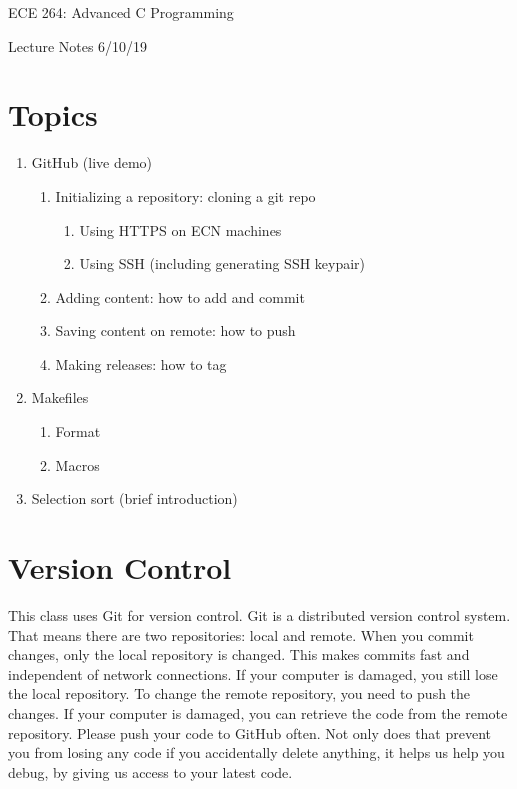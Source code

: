 \documentclass{article}
\begin{document}
\begin{center}{\LARGE ECE 264: Advanced C Programming} \end{center}
\begin{center}{\large Lecture Notes 6/10/19} \end{center}

\bigskip

\section{Topics}
\begin{enumerate}
\item GitHub (live demo)
	\begin{enumerate}
	\item Initializing a repository: cloning a git repo
	  \begin{enumerate}
	    \item Using HTTPS on ECN machines
	    \item Using SSH (including generating SSH keypair)
	  \end{enumerate}
	\item Adding content: how to add and commit
	\item Saving content on remote: how to push
	\item Making releases: how to tag
	\end{enumerate}
\item Makefiles
  \begin{enumerate}
  \item Format
  \item Macros
  \end{enumerate}
\item Selection sort (brief introduction)
\end{enumerate}


\section{Version Control}
This class uses Git for version control. Git is a distributed version control system. That means there are two repositories: local and remote. When you commit changes, only the local repository is changed. This makes commits fast and independent of network connections. If your computer is damaged, you still lose the local repository. To change the remote repository, you need to push the changes. If your computer is damaged, you can retrieve the code from the remote repository. Please push your code to GitHub often. Not only does that prevent you from losing any code if you accidentally delete anything, it helps us help you debug, by giving us access to your latest code.
\end{document}
